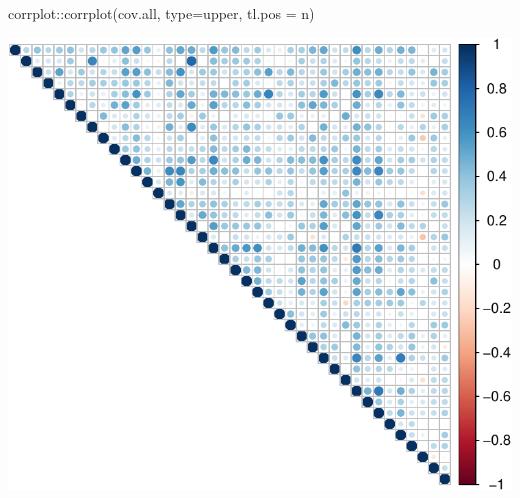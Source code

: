 \documentclass[
]{article}
\newenvironment{Shaded}{\begin{snugshade}}{\end{snugshade}}
\newcommand{\AttributeTok}[1]{\textcolor[rgb]{0.77,0.63,0.00}{#1}}
\newcommand{\FunctionTok}[1]{\textcolor[rgb]{0.00,0.00,0.00}{#1}}
\newcommand{\NormalTok}[1]{#1}
\newcommand{\SpecialCharTok}[1]{\textcolor[rgb]{0.00,0.00,0.00}{#1}}
\newcommand{\StringTok}[1]{\textcolor[rgb]{0.31,0.60,0.02}{#1}}
\begin{document}
\begin{Shaded}
\begin{Highlighting}[]
\NormalTok{corrplot}\SpecialCharTok{::}\FunctionTok{corrplot}\NormalTok{(cov.all, }\AttributeTok{type=}\StringTok{\textquotesingle{}upper\textquotesingle{}}\NormalTok{, }\AttributeTok{tl.pos =} \StringTok{\textquotesingle{}n\textquotesingle{}}\NormalTok{)}
\end{Highlighting}
\end{Shaded}

\includegraphics{TP1_files/figure-latex/correlation-1.pdf}
\end{document}
